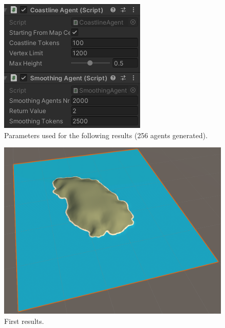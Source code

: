 \documentclass[12pt]{article}
\begin{document}
    \begin{figure}[H]
        \centering
        \includegraphics[scale = 0.8]{images/Smoothing agent/256 agenti/Parameters}
        \caption{Parameters used for the following results (256 agents generated).}
        \label{fig:smoothingParam}
    \end{figure}

    \begin{figure}[H]
        \centering
        \includegraphics[scale = 0.3]{images/Smoothing agent/256 agenti/1}
        \caption{First results.}
    \end{figure}
\end{document}
